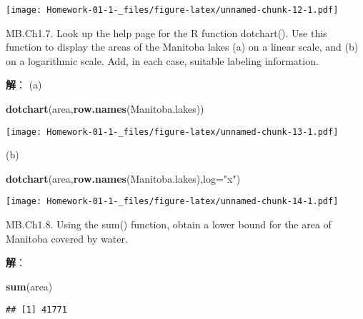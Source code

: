 \documentclass[
]{article}
\newenvironment{Shaded}{\begin{snugshade}}{\end{snugshade}}
\newcommand{\DataTypeTok}[1]{\textcolor[rgb]{0.13,0.29,0.53}{#1}}
\newcommand{\KeywordTok}[1]{\textcolor[rgb]{0.13,0.29,0.53}{\textbf{#1}}}
\newcommand{\NormalTok}[1]{#1}
\newcommand{\StringTok}[1]{\textcolor[rgb]{0.31,0.60,0.02}{#1}}
\begin{document}
\texttt{[image: Homework-01-1-\_files/figure-latex/unnamed-chunk-12-1.pdf]}

MB.Ch1.7. Look up the help page for the R function dotchart(). Use this
function to display the areas of the Manitoba lakes (a) on a linear
scale, and (b) on a logarithmic scale. Add, in each case, suitable
labeling information.

\textbf{解}： (a)

\begin{Shaded}
\begin{Highlighting}[]
\KeywordTok{dotchart}\NormalTok{(area,}\KeywordTok{row.names}\NormalTok{(Manitoba.lakes))}
\end{Highlighting}
\end{Shaded}

\texttt{[image: Homework-01-1-\_files/figure-latex/unnamed-chunk-13-1.pdf]}

(b)

\begin{Shaded}
\begin{Highlighting}[]
\KeywordTok{dotchart}\NormalTok{(area,}\KeywordTok{row.names}\NormalTok{(Manitoba.lakes),}\DataTypeTok{log=}\StringTok{"x"}\NormalTok{)}
\end{Highlighting}
\end{Shaded}

\texttt{[image: Homework-01-1-\_files/figure-latex/unnamed-chunk-14-1.pdf]}

MB.Ch1.8. Using the sum() function, obtain a lower bound for the area of
Manitoba covered by water.

\textbf{解}：

\begin{Shaded}
\begin{Highlighting}[]
\KeywordTok{sum}\NormalTok{(area)}
\end{Highlighting}
\end{Shaded}

\begin{verbatim}
## [1] 41771
\end{verbatim}
\end{document}
